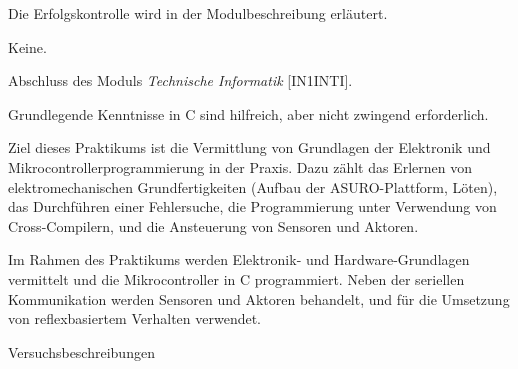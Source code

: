 \begin{course}

\setdoclanguagegerman
{}



\coursehead


\label{cour_7525.dp_997}


\begin{styleenv}
\begin{assessment}
Die Erfolgskontrolle wird in der Modulbeschreibung erläutert.


\end{assessment}

\begin{conditions}Keine.\end{conditions}

\begin{recommendations}Abschluss des Moduls \emph{Technische Informatik} [IN1INTI].

 

Grundlegende Kenntnisse in C sind hilfreich, aber nicht zwingend erforderlich.

\end{recommendations}
\end{styleenv}

\begin{learningoutcomes}
Ziel dieses Praktikums ist die Vermittlung von Grundlagen der Elektronik und Mikrocontrollerprogrammierung in der Praxis. Dazu zählt das Erlernen von elektromechanischen Grundfertigkeiten (Aufbau der ASURO-Plattform, Löten), das Durchführen einer Fehlersuche, die Programmierung unter Verwendung von Cross-Compilern, und die Ansteuerung von Sensoren und Aktoren.


\end{learningoutcomes}

\begin{content}
Im Rahmen des Praktikums werden Elektronik- und Hardware-Grundlagen vermittelt und die Mikrocontroller in C programmiert. Neben der seriellen Kommunikation werden Sensoren und Aktoren behandelt, und für die Umsetzung von reflexbasiertem Verhalten verwendet.


\end{content}

\begin{media}Versuchsbeschreibungen

\end{media}





\end{course}